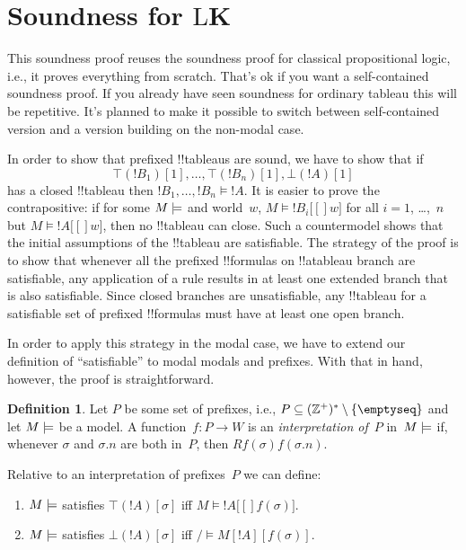 \documentclass[10pt,a4paper]{article}
\theoremstyle{plain}
\theoremstyle{definition}
\newtheorem{defn}[thm]{Definition}
\theoremstyle{remark}
\newenvironment{explain}{}{}
\newenvironment{editorial}{}{}
\newcommand*{\olfileid}[3]{}
\newcommand*{\olsection}[1]{\section*{#1}}
\providecommand{\Entails}{\mathrel{\models}}
\providecommand{\sFmla}[2]{#1(#2)}
\providecommand{\True}{\top}
\providecommand{\False}{\bot}
\providecommand{\mSat}[3]{\ensuremath{#1 \models #2[#3]}}
\providecommand{\mModel}[2]{\ensuremath{#1 \models #2}}
\providecommand{\Log}{\ensuremath{\mathrm{L}}}
\providecommand{\PosInt}{\mathbb{Z}^{+}}
\begin{document}



\olfileid{nml}{tab}{sou}

\olsection{Soundness for \Log{K}}

\begin{editorial}
  This soundness proof reuses the soundness proof for classical
  propositional logic, i.e., it proves everything from scratch. That's
  ok if you want a self-contained soundness proof. If you already have
  seen soundness for ordinary tableau this will be repetitive. It's
  planned to make it possible to switch between self-contained version
  and a version building on the non-modal case.
\end{editorial}

\begin{explain}
  In order to show that prefixed !!{tableau}s are sound, we have to
  show that if
  \[
  \sFmla{\True}{!B_1}[1], \dots, \sFmla{\True}{!B_n}[1], \sFmla{\False}{!A}[1]
  \]
  has a closed !!{tableau} then $!B_1, \dots, !B_n \Entails !A$. It is
  easier to prove the contrapositive: if for some $\mModel{M}$ and
  world~$w$, $\mSat{M}{!B_i}[w]$ for all $i=1$, \dots,~$n$ but
  $\mSat{M}{!A}[w]$, then no !!{tableau} can close. Such a
  countermodel shows that the initial assumptions of the !!{tableau}
  are satisfiable. The strategy of the proof is to show that whenever
  all the prefixed !!{formula}s on !!a{tableau} branch are
  satisfiable, any application of a rule results in at least one
  extended branch that is also satisfiable. Since closed branches are
  unsatisfiable, any !!{tableau} for a satisfiable set of prefixed
  !!{formula}s must have at least one open branch.

  In order to apply this strategy in the modal case, we have to extend
  our definition of ``satisfiable'' to modal modals and prefixes. With
  that in hand, however, the proof is straightforward.
\end{explain}

\begin{defn}
  Let $P$ be some set of prefixes, i.e., $P \subseteq (\PosInt)^*
  \setminus \{\emptyseq\}$ and let $\mModel{M}$ be a model.  A
  function~$f\colon P \to W$ is an \emph{interpretation of}~$P$
  in~$\mModel{M}$ if, whenever $\sigma$ and $\sigma.n$ are both
  in~$P$, then $Rf(\sigma)f(\sigma.n)$.

  Relative to an interpretation of prefixes~$P$ we can define:
  \begin{enumerate}
  \item $\mModel{M}$ satisfies $\sFmla{\True}{!A}[\sigma]$ iff
    $\mSat{M}{!A}[f(\sigma)]$.
  \item $\mModel{M}$ satisfies $\sFmla{\False}{!A}[\sigma]$ iff
    $\mSat/{M}{!A}[f(\sigma)]$.
  \end{enumerate}
\end{defn}
\end{document}
